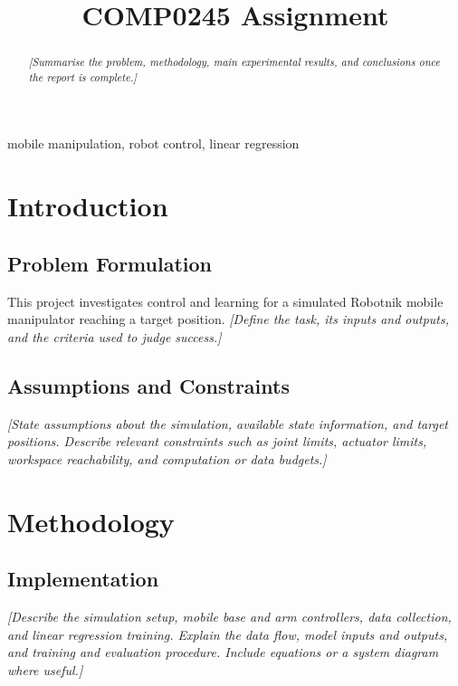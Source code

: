 \documentclass[conference]{IEEEtran}
\begin{document}
\title{COMP0245 Assignment}

\author{
}

\maketitle

\begin{abstract}
\textit{[Summarise the problem, methodology, main experimental results, and conclusions once the report is complete.]}
\end{abstract}

\begin{IEEEkeywords}
mobile manipulation, robot control, linear regression
\end{IEEEkeywords}

\section{Introduction}
\subsection{Problem Formulation}
This project investigates control and learning for a simulated Robotnik mobile manipulator reaching a target position.
\textit{[Define the task, its inputs and outputs, and the criteria used to judge success.]}

\subsection{Assumptions and Constraints}
\textit{[State assumptions about the simulation, available state information, and target positions. Describe relevant constraints such as joint limits, actuator limits, workspace reachability, and computation or data budgets.]}

\section{Methodology}
\subsection{Implementation}
\textit{[Describe the simulation setup, mobile base and arm controllers, data collection, and linear regression training. Explain the data flow, model inputs and outputs, and training and evaluation procedure. Include equations or a system diagram where useful.]}
\end{document}
